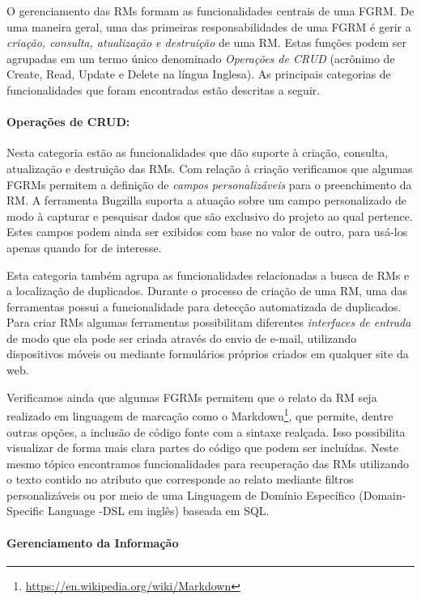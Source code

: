 O gerenciamento das RMs formam as funcionalidades centrais de uma FGRM\@. De uma
maneira geral, uma das primeiras responsabilidades de uma FGRM é gerir a
\textit{criação, consulta, atualização e destruição} de uma RM\@. Estas funções
podem ser agrupadas em um termo único denominado \textit{Operações de CRUD}
(acrônimo de Create, Read, Update e Delete na língua Inglesa). As principais
categorias de funcionalidades que foram encontradas estão descritas a seguir.

\paragraph{Operações de CRUD:}
\label{par:operações_de_crud}

Nesta categoria estão as funcionalidades que dão suporte à criação,	consulta,
atualização e destruição das RMs. Com relação à criação verificamos que algumas
FGRMs permitem a definição de \textit{campos personalizáveis} para o
preenchimento da RM\@. A ferramenta Bugzilla suporta a atuação sobre um campo
personalizado de modo à capturar e pesquisar dados que são exclusivo do projeto
ao qual pertence. Estes campos podem ainda ser exibidos com base no valor de
outro, para usá-los apenas quando for de interesse.

Esta categoria também agrupa as funcionalidades relacionadas a busca de RMs e a
localização de duplicados. Durante o processo de criação de uma RM, uma das
ferramentas possui a funcionalidade para detecção automatizada de duplicados.
Para criar RMs algumas ferramentas possibilitam diferentes \textit{interfaces de
    entrada} de modo que ela pode ser criada através do envio de e-mail,
utilizando dispositivos móveis ou mediante formulários próprios criados em
qualquer site da web.

Verificamos ainda que algumas FGRMs permitem que o relato da RM seja realizado
em linguagem de marcação como o
Markdown\footnote{\url{https://en.wikipedia.org/wiki/Markdown}}, que permite,
dentre outras opções, a inclusão de código fonte com a sintaxe realçada. Isso
possibilita visualizar de forma mais clara partes do código que podem ser
incluídas. Neste mesmo tópico encontramos funcionalidades para recuperação das
RMs utilizando o texto contido no atributo que corresponde ao relato mediante
filtros personalizáveis ou por meio de uma Linguagem de Domínio Específico
(Domain-Specific Language \@-\@ DSL em inglês) baseada em SQL\@.

\paragraph{Gerenciamento da Informação}
\label{par:gerenciamento_da_informação}

